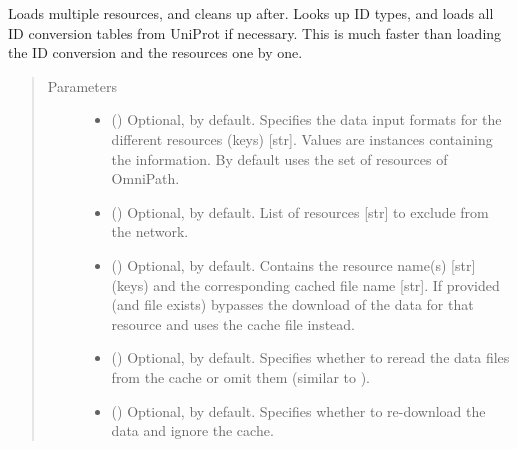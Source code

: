 \documentclass[letterpaper,10pt,english]{sphinxmanual}
\begin{document}
\begin{fulllineitems}
\begin{fulllineitems}
\label{\detokenize{reference:pypath.main.PyPath.load_resources}}
Loads multiple resources, and cleans up after. Looks up ID
types, and loads all ID conversion tables from UniProt if
necessary. This is much faster than loading the ID conversion
and the resources one by one.
\begin{quote}\begin{description}
\item[{Parameters}] \leavevmode\begin{itemize}
\item {} 
 () \textendash{} Optional,  by default. Specifies the data input
formats for the different resources (keys) {[}str{]}. Values
are  instances
containing the information. By default uses the set of
resources of OmniPath.

\item {} 
 () \textendash{} Optional, \sphinxcode{\sphinxupquote{{[}{]}}} by default. List of resources {[}str{]} to
exclude from the network.

\item {} 
 () \textendash{} Optional, \sphinxcode{\sphinxupquote{\{\}}} by default. Contains the resource name(s)
{[}str{]} (keys) and the corresponding cached file name {[}str{]}.
If provided (and file exists) bypasses the download of the
data for that resource and uses the cache file instead.

\item {} 
 () \textendash{} Optional,  by default. Specifies whether to reread
the data files from the cache or omit them (similar to
).

\item {} 
 () \textendash{} Optional,  by default. Specifies whether to
re-download the data and ignore the cache.


\end{itemize}
\end{description}
\end{quote}
\end{fulllineitems}
\end{fulllineitems}
\end{document}
